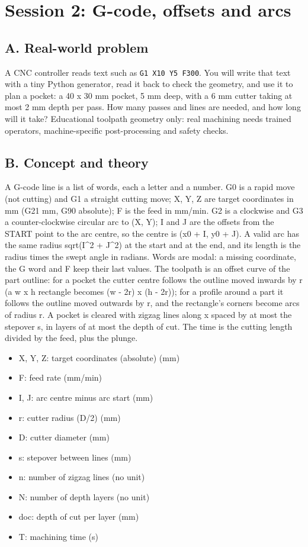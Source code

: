 \documentclass[11pt,a4paper]{article}
\begin{document}
\section{Session 2: G-code, offsets and arcs}

\subsection*{A. Real-world problem}
A CNC controller reads text such as \texttt{G1 X10 Y5 F300}. You will write that text with a tiny Python generator, read it back to check the geometry, and use it to plan a pocket: a 40 x 30 mm pocket, 5 mm deep, with a 6 mm cutter taking at most 2 mm depth per pass. How many passes and lines are needed, and how long will it take? Educational toolpath geometry only: real machining needs trained operators, machine-specific post-processing and safety checks.

\subsection*{B. Concept and theory}
A G-code line is a list of words, each a letter and a number. G0 is a rapid move (not cutting) and G1 a straight cutting move; X, Y, Z are target coordinates in mm (G21 mm, G90 absolute); F is the feed in mm/min. G2 is a clockwise and G3 a counter-clockwise circular arc to (X, Y); I and J are the offsets from the START point to the arc centre, so the centre is (x0 + I, y0 + J). A valid arc has the same radius sqrt(I\textasciicircum{}2 + J\textasciicircum{}2) at the start and at the end, and its length is the radius times the swept angle in radians. Words are modal: a missing coordinate, the G word and F keep their last values. The toolpath is an offset curve of the part outline: for a pocket the cutter centre follows the outline moved inwards by r (a w x h rectangle becomes (w - 2r) x (h - 2r)); for a profile around a part it follows the outline moved outwards by r, and the rectangle's corners become arcs of radius r. A pocket is cleared with zigzag lines along x spaced by at most the stepover s, in layers of at most the depth of cut. The time is the cutting length divided by the feed, plus the plunge.

\begin{itemize}[nosep]
\item X, Y, Z: target coordinates (absolute) (mm)
\item F: feed rate (mm/min)
\item I, J: arc centre minus arc start (mm)
\item r: cutter radius (D/2) (mm)
\item D: cutter diameter (mm)
\item s: stepover between lines (mm)
\item n: number of zigzag lines (no unit)
\item N: number of depth layers (no unit)
\item doc: depth of cut per layer (mm)
\item T: machining time (s)
\end{itemize}
\end{document}
